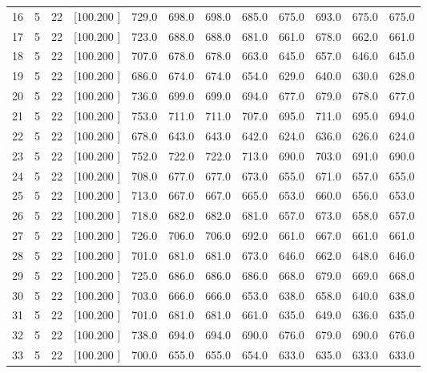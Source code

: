 \documentclass[12pt,a4paper]{article}
\begin{document}
\begin{center}
{\begin{tabular}{r r r r r r r r r r r r}
  16&  5& 22&[100.200   ]&   729.0&   698.0&   698.0&   685.0&   675.0&   693.0&   675.0&   675.0\\[-0.02in]
  17&  5& 22&[100.200   ]&   723.0&   688.0&   688.0&   681.0&   661.0&   678.0&   662.0&   661.0\\[-0.02in]
  18&  5& 22&[100.200   ]&   707.0&   678.0&   678.0&   663.0&   645.0&   657.0&   646.0&   645.0\\[-0.02in]
  19&  5& 22&[100.200   ]&   686.0&   674.0&   674.0&   654.0&   629.0&   640.0&   630.0&   628.0\\[-0.02in]
  20&  5& 22&[100.200   ]&   736.0&   699.0&   699.0&   694.0&   677.0&   679.0&   678.0&   677.0\\[-0.02in]
  21&  5& 22&[100.200   ]&   753.0&   711.0&   711.0&   707.0&   695.0&   711.0&   695.0&   694.0\\[-0.02in]
  22&  5& 22&[100.200   ]&   678.0&   643.0&   643.0&   642.0&   624.0&   636.0&   626.0&   624.0\\[-0.02in]
  23&  5& 22&[100.200   ]&   752.0&   722.0&   722.0&   713.0&   690.0&   703.0&   691.0&   690.0\\[-0.02in]
  24&  5& 22&[100.200   ]&   708.0&   677.0&   677.0&   673.0&   655.0&   671.0&   657.0&   655.0\\[-0.02in]
  25&  5& 22&[100.200   ]&   713.0&   667.0&   667.0&   665.0&   653.0&   660.0&   656.0&   653.0\\[-0.02in]
  26&  5& 22&[100.200   ]&   718.0&   682.0&   682.0&   681.0&   657.0&   673.0&   658.0&   657.0\\[-0.02in]
  27&  5& 22&[100.200   ]&   726.0&   706.0&   706.0&   692.0&   661.0&   667.0&   661.0&   661.0\\[-0.02in]
  28&  5& 22&[100.200   ]&   701.0&   681.0&   681.0&   673.0&   646.0&   662.0&   648.0&   646.0\\[-0.02in]
  29&  5& 22&[100.200   ]&   725.0&   686.0&   686.0&   686.0&   668.0&   679.0&   669.0&   668.0\\[-0.02in]
  30&  5& 22&[100.200   ]&   703.0&   666.0&   666.0&   653.0&   638.0&   658.0&   640.0&   638.0\\[-0.02in]
  31&  5& 22&[100.200   ]&   701.0&   681.0&   681.0&   661.0&   635.0&   649.0&   636.0&   635.0\\[-0.02in]
  32&  5& 22&[100.200   ]&   738.0&   694.0&   694.0&   690.0&   676.0&   679.0&   690.0&   676.0\\[-0.02in]
  33&  5& 22&[100.200   ]&   700.0&   655.0&   655.0&   654.0&   633.0&   635.0&   633.0&   633.0\\[-0.02in]

\end{tabular}}
\end{center}
\end{document}
